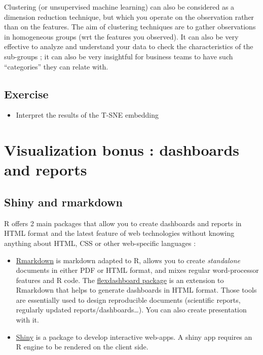 \documentclass[
]{book}
\providecommand{\tightlist}{%
  \setlength{\itemsep}{0pt}\setlength{\parskip}{0pt}}
\begin{document}
Clustering (or unsupervised machine learning) can also be considered as a dimension reduction technique, but which you operate on the observation rather than on the features. The aim of clustering techniques are to gather observations in homogeneous groups (wrt the features you observed).
It can also be very effective to analyze and understand your data to check the characteristics of the sub-groups ; it can also be very insightful for business teams to have such ``categories'' they can relate with.

\hypertarget{exercise}{%
\subsection{Exercise}\label{exercise}}

\begin{itemize}
\tightlist
\item
  Interpret the results of the T-SNE embedding
\end{itemize}

\hypertarget{visualization-bonus-dashboards-and-reports}{%
\section{Visualization bonus : dashboards and reports}\label{visualization-bonus-dashboards-and-reports}}

\hypertarget{shiny-and-rmarkdown}{%
\subsection{Shiny and rmarkdown}\label{shiny-and-rmarkdown}}

R offers 2 main packages that allow you to create dashboards and reports in HTML format and the latest feature of web technologies without knowing anything about HTML, CSS or other web-specific languages :

\begin{itemize}
\tightlist
\item
  \href{https://rmarkdown.rstudio.com/}{Rmarkdown} is markdown adapted to R, allows you to create \emph{standalone} documents in either PDF or HTML format, and mixes regular word-processor features and R code. The \href{https://rmarkdown.rstudio.com/flexdashboard/}{flexdashboard package} is an extension to Rmarkdown that helps to generate dashboards in HTML format. Those tools are essentially used to design reproducible documents (scientific reports, regularly updated reports/dashboards\ldots). You can also create presentation with it.
\item
  \href{https://shiny.rstudio.com/gallery/}{Shiny} is a package to develop interactive web-apps. A shiny app requires an R engine to be rendered on the client side.
\end{itemize}
\end{document}
